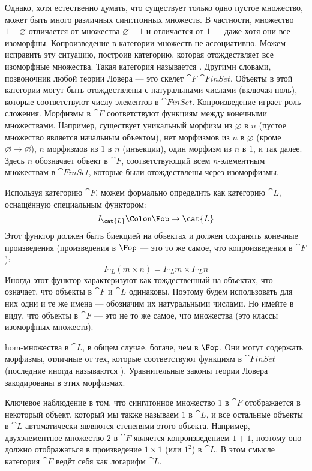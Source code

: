 Однако, хотя естественно думать, что существует только одно пустое
множество, может быть много различных синглтонных множеств. В частности, множество
$1 + \varnothing$ отличается от множества $\varnothing + 1$ и
отличается от $1$ --- даже хотя они все изоморфны.
Копроизведение в категории множеств не ассоциативно. Можем исправить эту
ситуацию, построив категорию, которая отождествляет все изоморфные множества.
Такая категория называется . Другими словами,
позвоночник любой теории Ловера — это скелет $\cat{F}$
$\cat{FinSet}$. Объекты в этой категории могут быть отождествлены с
натуральными числами (включая ноль), которые соответствуют числу элементов в
$\cat{FinSet}$. Копроизведение играет роль сложения. Морфизмы в
$\cat{F}$ соответствуют функциям между конечными множествами. Например,
существует уникальный морфизм из $\varnothing$ в $n$ (пустое множество
является начальным объектом), нет морфизмов из $n$ в $\varnothing$
(кроме $\varnothing \to \varnothing$), $n$ морфизмов из $1$ в
$n$ (инъекции), один морфизм из $n$ в $1$,
и так далее. Здесь $n$ обозначает объект в $\cat{F}$,
соответствующий всем $n$-элементным множествам в $\cat{FinSet}$, которые были
отождествлены через изоморфизмы.

Используя категорию $\cat{F}$, можем формально определить  как категорию $\cat{L}$, оснащённую специальным функтором:
\[I_{\cat{L}} \Colon \Fop \to \cat{L}\]
Этот функтор должен быть биекцией на объектах и должен сохранять конечные
произведения (произведения в $\Fop$ — это то же самое, что
копроизведения в $\cat{F}$):
\[I_{\cat{L}} (m\times{}n) = I_{\cat{L}} m\times{}I_{\cat{L}} n\]
Иногда этот функтор характеризуют как тождественный-на-объектах,
что означает, что объекты в $\cat{F}$ и $\cat{L}$ одинаковы.
Поэтому будем использовать для них одни и те же имена --- обозначим их
натуральными числами. Но имейте в виду, что объекты в $\cat{F}$ — это не
то же самое, что множества (это классы изоморфных множеств).

hom-множества в $\cat{L}$, в общем случае, богаче, чем в
$\Fop$. Они могут содержать морфизмы, отличные от
тех, которые соответствуют функциям в $\cat{FinSet}$ (последние иногда
называются ). Уравнительные законы
теории Ловера закодированы в этих морфизмах.

Ключевое наблюдение в том, что синглтонное множество $1$ в $\cat{F}$
отображается в некоторый объект, который мы также называем $1$ в $\cat{L}$, и
все остальные объекты в $\cat{L}$ автоматически являются степенями этого
объекта. Например, двухэлементное множество $2$ в $\cat{F}$ является
копроизведением $1 + 1$, поэтому оно должно отображаться в произведение
$1 \times 1$ (или $1^2$) в $\cat{L}$. В этом смысле категория
$\cat{F}$ ведёт себя как логарифм $\cat{L}$.

